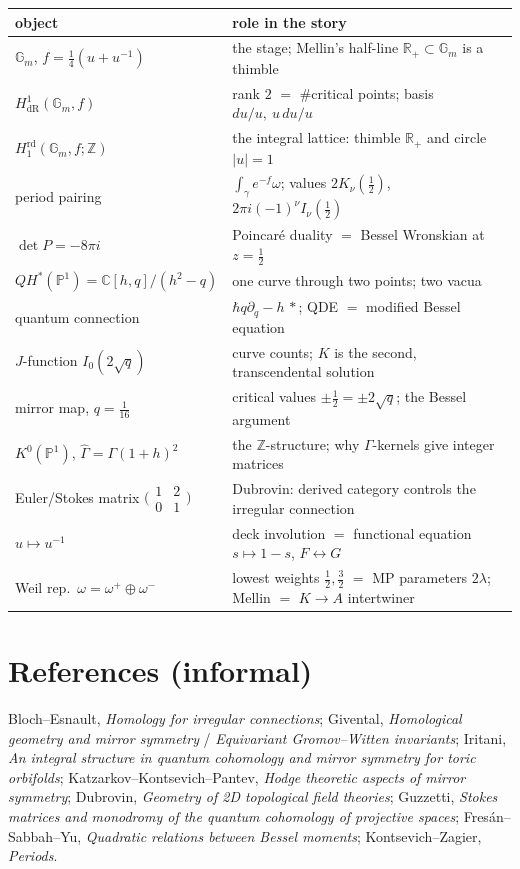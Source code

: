 \documentclass[11pt]{article}
\theoremstyle{definition}
\theoremstyle{remark}
\newcommand{\R}{\mathbb{R}}
\newcommand{\C}{\mathbb{C}}
\newcommand{\Z}{\mathbb{Z}}
\newcommand{\Gm}{\mathbb{G}_m}
\newcommand{\PP}{\mathbb{P}}
\newcommand{\dR}{\mathrm{dR}}
\newcommand{\rd}{\mathrm{rd}}
\newcommand{\G}{\Gamma}
\newcommand{\hbarr}{\hbar}
\begin{document}
\begin{center}
\begin{tabular}{ll}
\toprule
object & role in the story \\
\midrule
$\Gm$, $f = \tfrac14(u+u^{-1})$ & the stage; Mellin's half-line
$\R_+ \subset \Gm$ is a thimble \\
$H^1_{\dR}(\Gm, f)$ & rank $2$ $=$ \#critical points; basis
$du/u,\ u\,du/u$ \\
$H_1^{\rd}(\Gm, f;\Z)$ & the integral lattice: thimble $\R_+$ and
circle $|u|=1$ \\
period pairing & $\int_\gamma e^{-f}\omega$; values
$2K_\nu(\tfrac12)$, $2\pi i(-1)^\nu I_\nu(\tfrac12)$ \\
$\det P = -8\pi i$ & Poincar\'e duality $=$ Bessel Wronskian at
$z = \tfrac12$ \\
$QH^\ast(\PP^1) = \C[h,q]/(h^2{-}q)$ & one curve through two
points; two vacua \\
quantum connection & $\hbarr q\partial_q - h\,\ast$; QDE $=$
modified Bessel equation \\
$J$-function $I_0(2\sqrt q)$ & curve counts; $K$ is the second,
transcendental solution \\
mirror map, $q = \tfrac1{16}$ & critical values $\pm\tfrac12 =
\pm2\sqrt q$; the Bessel argument \\
$K^0(\PP^1)$, $\widehat\G = \G(1{+}h)^2$ & the $\Z$-structure;
why $\G$-kernels give integer matrices \\
Euler/Stokes matrix
$\bigl(\begin{smallmatrix}1&2\\0&1\end{smallmatrix}\bigr)$ &
Dubrovin: derived category controls the irregular connection \\
$u \mapsto u^{-1}$ & deck involution $=$ functional equation
$s \mapsto 1-s$, $F \leftrightarrow G$ \\
Weil rep.\ $\omega = \omega^+ \oplus \omega^-$ & lowest weights
$\tfrac12, \tfrac32$ $=$ MP parameters $2\lambda$; Mellin $=$
$K\!\to\!A$ intertwiner \\
\bottomrule
\end{tabular}
\end{center}

\section*{References (informal)}

Bloch--Esnault, \emph{Homology for irregular connections};
Givental, \emph{Homological geometry and mirror symmetry} /
\emph{Equivariant Gromov--Witten invariants}; Iritani,
\emph{An integral structure in quantum cohomology and mirror
symmetry for toric orbifolds}; Katzarkov--Kontsevich--Pantev,
\emph{Hodge theoretic aspects of mirror symmetry}; Dubrovin,
\emph{Geometry of 2D topological field theories}; Guzzetti,
\emph{Stokes matrices and monodromy of the quantum cohomology of
projective spaces}; Fres\'an--Sabbah--Yu, \emph{Quadratic
relations between Bessel moments}; Kontsevich--Zagier,
\emph{Periods}.
\end{document}

